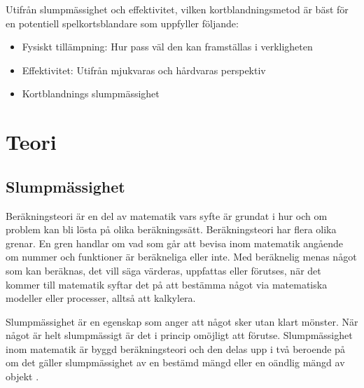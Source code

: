 \documentclass[swedish,a4paper]{article}
\begin{document}
Utifrån slumpmässighet och effektivitet, vilken kortblandningsmetod är bäst för
en potentiell spelkortsblandare som uppfyller följande:
\begin{itemize}
	\item Fysiskt tillämpning: Hur pass väl den kan framställas i verkligheten 
	\item Effektivitet: Utifrån mjukvaras och hårdvaras perspektiv
        \item Kortblandnings slumpmässighet
\end{itemize}


\section{Teori}
%

\subsection{Slumpmässighet}
\label{sec:slump}
Beräkningsteori är en del av matematik vars syfte är grundat i hur och om
problem kan bli lösta på olika beräkningssätt. Beräkningsteori har flera olika
grenar. En gren handlar om vad som går att bevisa inom matematik angående om
nummer och funktioner är beräkneliga eller inte. Med beräknelig menas något som
kan beräknas, det vill säga värderas, uppfattas eller förutses, när det kommer
till matematik syftar det på att bestämma något via matematiska
modeller eller processer, alltså att kalkylera.

Slumpmässighet är en egenskap som anger att något sker utan klart mönster. När
något är helt slumpmässigt är det i princip omöjligt att förutse. Slumpmässighet
inom matematik är byggd beräknings\-teori och den delas upp i två beroende på om
det gäller slumpmässighet av en bestämd mängd eller en oändlig mängd av objekt
\parencite[49-66]{Terwijn2016}.
\end{document}

